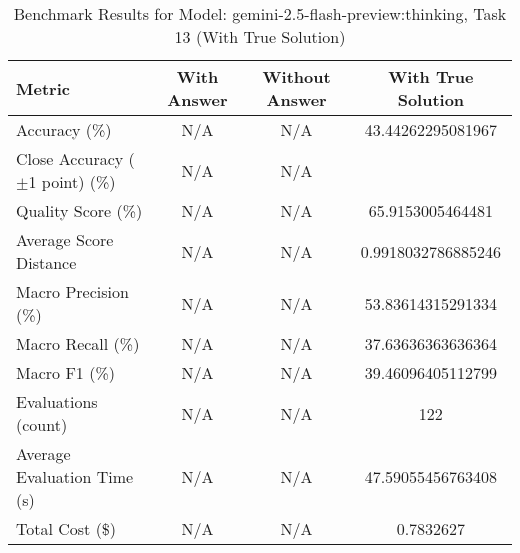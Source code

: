 \begin{table}[htbp]
\centering
\caption{Benchmark Results for Model: gemini-2.5-flash-preview:thinking, Task 13 (With True Solution)}
\begin{tabular}{lccc}
\toprule
\textbf{Metric} & \textbf{With Answer} & \textbf{Without Answer} & \textbf{With True Solution} \\
\midrule
Accuracy (\%) & N/A & N/A & 43.44262295081967 \\
Close Accuracy ($\pm$1 point) (\%) & N/A & N/A \\
Quality Score (\%) & N/A & N/A & 65.9153005464481 \\
Average Score Distance & N/A & N/A & 0.9918032786885246 \\
Macro Precision (\%) & N/A & N/A & 53.83614315291334 \\
Macro Recall (\%) & N/A & N/A & 37.63636363636364 \\
Macro F1 (\%) & N/A & N/A & 39.46096405112799 \\
Evaluations (count) & N/A & N/A & 122 \\
Average Evaluation Time (s) & N/A & N/A & 47.59055456763408 \\
Total Cost (\$) & N/A & N/A & 0.7832627 \\
\bottomrule
\end{tabular}
\end{table}
